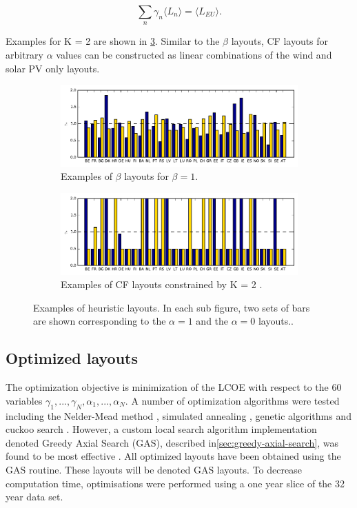 \documentclass[a4paper, 5p, sort&compress]{elsarticle}%
\newcommand{\mean}[1]{\langle #1 \rangle}
\newcommand{\chromowidth}{1.00 \columnwidth}
\begin{document}
\begin{equation}
  \label{eq:5}
  \sum_{n} \gamma_{n} \mean{L_{n}} = \mean{L_{EU}}.
\end{equation}

Examples for K = 2 are shown in
\cref{fig:examples}. Similar to the $\beta$ layouts, CF layouts for
arbitrary $\alpha$ values can be constructed as linear combinations of the
wind and solar PV only layouts.

\begin{figure}[h!]
  \centering
  \begin{subfigure}{2\columnwidth}
    \includegraphics[width = \chromowidth, center]{beta=1}
    \caption{Examples of $\beta$ layouts for $\beta = 1$.}
    \label{fig:betaExamples}    
  \end{subfigure}
  \begin{subfigure}{2\columnwidth}
    \includegraphics[width = \chromowidth, center]{k=2cfMax}
    \caption{Examples of CF layouts constrained by K = 2 .}
    \label{fig:cfMaxExamples}    
  \end{subfigure}
  \caption{Examples of heuristic layouts. In each sub figure, two sets
    of bars are shown corresponding to the $\alpha = 1$ and the $\alpha = 0$ layouts..}
  \label{fig:examples}
\end{figure}

\subsection{Optimized layouts}
\label{sec:optimized-layouts}

The optimization objective is minimization of the LCOE with respect to
the 60 variables
$\gamma_{1}, ..., \gamma_{N}, \alpha_{1}, ..., \alpha_{N}$.  A number of optimization
algorithms were tested including the Nelder-Mead method \cite{nelder},
simulated annealing \cite{sa}, genetic algorithms \cite{ga} and cuckoo
search \cite{cs}. However, a custom local search algorithm
implementation denoted Greedy Axial Search (GAS), described
in\cref{sec:greedy-axial-search}, was found to be most effective
\cite{emil}. All optimized layouts have been obtained using the GAS
routine. These layouts will be denoted GAS layouts. To decrease
computation time, optimisations were performed using a one year slice
of the 32 year data set.
\end{document}
